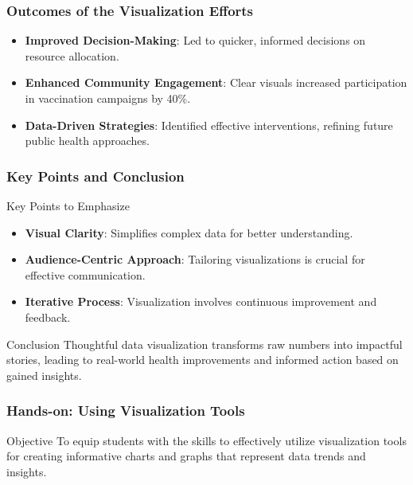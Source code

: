 \documentclass[aspectratio=169]{beamer}
\begin{document}
\begin{frame}[fragile]
    \frametitle{Outcomes of the Visualization Efforts}
    \begin{itemize}
        \item \textbf{Improved Decision-Making}: Led to quicker, informed decisions on 
        resource allocation.
        \item \textbf{Enhanced Community Engagement}: Clear visuals increased participation 
        in vaccination campaigns by 40\%.
        \item \textbf{Data-Driven Strategies}: Identified effective interventions, refining 
        future public health approaches.
    \end{itemize}
\end{frame}

\begin{frame}[fragile]
    \frametitle{Key Points and Conclusion}
    \begin{block}{Key Points to Emphasize}
        \begin{itemize}
            \item \textbf{Visual Clarity}: Simplifies complex data for better understanding.
            \item \textbf{Audience-Centric Approach}: Tailoring visualizations is crucial for 
            effective communication.
            \item \textbf{Iterative Process}: Visualization involves continuous improvement 
            and feedback.
        \end{itemize}
    \end{block}
    
    \begin{block}{Conclusion}
        Thoughtful data visualization transforms raw numbers into impactful stories, leading 
        to real-world health improvements and informed action based on gained insights.
    \end{block}
\end{frame}

\begin{frame}[fragile]
    \frametitle{Hands-on: Using Visualization Tools}
    \begin{block}{Objective}
        To equip students with the skills to effectively utilize visualization tools for creating informative charts and graphs that represent data trends and insights.
    \end{block}
\end{frame}
\end{document}
